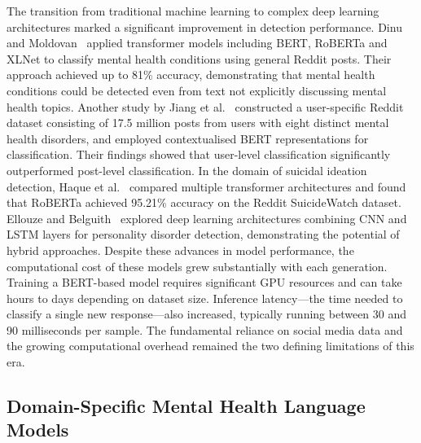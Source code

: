 \documentclass[11pt]{article}
\begin{document}
The transition from traditional machine learning to complex deep learning architectures marked a
significant improvement in detection performance. Dinu and Moldovan~\cite{dinu2021automatic}
applied transformer models including BERT, RoBERTa and XLNet to classify mental health
conditions using general Reddit posts. Their approach achieved up to 81\% accuracy, demonstrating
that mental health conditions could be detected even from text not explicitly discussing mental
health topics. Another study by Jiang et al.~\cite{jiang-etal-2020-detection} constructed a
user-specific Reddit dataset consisting of 17.5 million posts from users with eight distinct
mental health disorders, and employed contextualised BERT representations for classification.
Their findings showed that user-level classification significantly outperformed post-level
classification. In the domain of suicidal ideation detection, Haque et
al.~\cite{suicidalideationtransformers2020} compared multiple transformer architectures and found
that RoBERTa achieved 95.21\% accuracy on the Reddit SuicideWatch dataset. Ellouze and
Belguith~\cite{ellouze2022deep} explored deep learning architectures combining CNN and LSTM
layers for personality disorder detection, demonstrating the potential of hybrid approaches.
Despite these advances in model performance, the computational cost of these models grew
substantially with each generation. Training a BERT-based model requires significant GPU
resources and can take hours to days depending on dataset size. Inference latency---the time
needed to classify a single new response---also increased, typically running between 30 and 90
milliseconds per sample. The fundamental reliance on social media data and the growing
computational overhead remained the two defining limitations of this era.

\subsection{Domain-Specific Mental Health Language Models}
\end{document}
